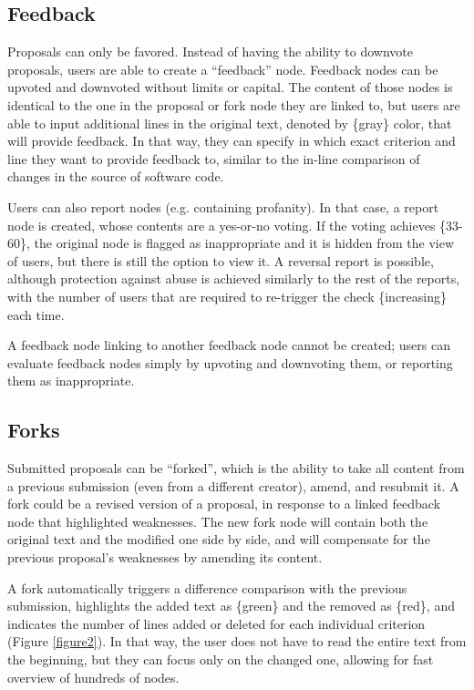 \documentclass[a4paper,11pt]{article}
\begin{document}
\begin{multicols}{2}
\subsection{Feedback} \label{feedback}

Proposals can only be favored. Instead of having the ability to downvote proposals, users are able to create a “feedback” node. Feedback nodes can be upvoted and downvoted without limits or capital. The content of those nodes is identical to the one in the proposal or fork node they are linked to, but users are able to input additional lines in the original text, denoted by \{gray\} color, that will provide feedback. In that way, they can specify in which exact criterion and line they want to provide feedback to, similar to the in-line comparison of changes in the source of software code.

Users can also report nodes (e.g. containing profanity). In that case, a report node is created, whose contents are a yes-or-no voting. If the voting achieves \{33-60\}, the original node is flagged as inappropriate and it is hidden from the view of users, but there is still the option to view it. A reversal report is possible, although protection against abuse is achieved similarly to the rest of the reports, with the number of users that are required to re-trigger the check \{increasing\} each time.

A feedback node linking to another feedback node cannot be created; users can evaluate feedback nodes simply by upvoting and downvoting them, or reporting them as inappropriate.

\subsection{Forks} \label{forks}

Submitted proposals can be “forked”, which is the ability to take all content from a previous submission (even from a different creator), amend, and resubmit it. A fork could be a revised version of a proposal, in response to a linked feedback node that highlighted weaknesses. The new fork node will contain both the original text and the modified one side by side, and will compensate for the previous proposal's weaknesses by amending its content.

A fork automatically triggers a difference comparison with the previous submission, highlights the added text as \{green\} and the removed as \{red\}, and indicates the number of lines added or deleted for each individual criterion (Figure \ref{figure2}). In that way, the user does not have to read the entire text from the beginning, but they can focus only on the changed one, allowing for fast overview of hundreds of nodes.


\end{multicols}
\end{document}

